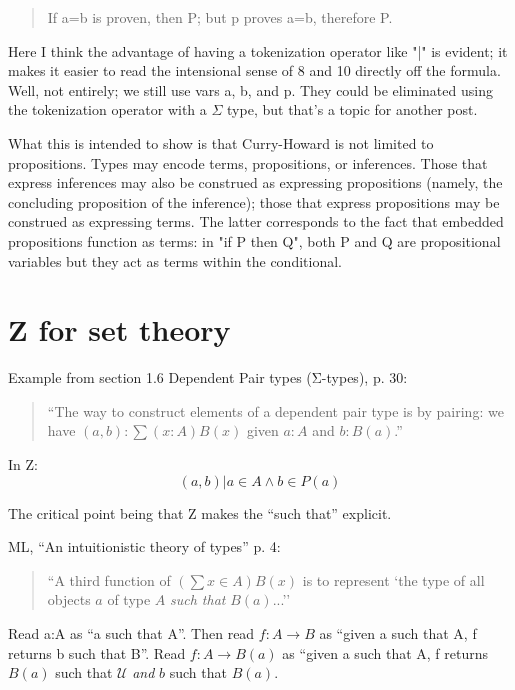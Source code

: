 \documentclass{article}
\begin{document}
\begin{quote}
    If a=b is proven, then P; but p proves a=b, therefore P.
\end{quote}

Here I think the advantage of having a tokenization operator like "|" is evident; it makes it easier to read the intensional sense of 8 and 10 directly off the formula.  Well, not entirely; we still use vars a, b, and p.   They could be eliminated using the tokenization operator with a \(\Sigma\) type, but that's a topic for another post.

What this is intended to show is that Curry-Howard is not limited to propositions.  Types may encode terms, propositions, or inferences.   Those that express inferences may also be construed as expressing propositions (namely, the concluding proposition of the inference); those that express propositions may be construed as expressing terms.  The latter corresponds to the fact that embedded propositions function as terms: in "if P then Q", both P and Q are propositional variables but they act as terms within the conditional.

\section{Z for set theory}

Example from section 1.6 Dependent Pair types (Σ-types), p. 30:

\begin{quote}
``The way to construct elements of a dependent pair type is by
pairing: we have \((a,b) : ∑(x:A) B(x)\) given \(a : A\) and \(b :
B(a)\).''
\end{quote}

In Z: \[ {(a,b) | a\in A \land b\in P(a)} \]

The critical point being that Z makes the ``such that'' explicit.

ML, ``An intuitionistic theory of types'' p. 4:
\begin{quote}
``A third function of \((\sum x\in A)B(x)\) is to represent `the type
of all objects \(a\) of type \(A\) \emph{such that} \(B(a)\)...''
\end{quote}

Read a:A as ``a such that A''.  Then read \(f:A\to B\) as ``given a
such that A, f returns b such that B''.  Read \(f:A\to B(a)\) as
``given a such that A, f returns \(B(a)\) such that \(\mathcal{U}\)
\emph{and} \(b\) such that \(B(a)\).
\end{document}
